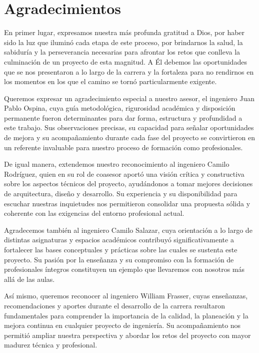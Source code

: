 
\section*{Agradecimientos}

En primer lugar, expresamos nuestra m\'as profunda gratitud a Dios, por haber sido la luz que ilumin\'o cada etapa de este proceso, por brindarnos la salud, la sabidur\'ia y la perseverancia necesarias para afrontar los retos que conlleva la culminaci\'on de un proyecto de esta magnitud. A \'El debemos las oportunidades que se nos presentaron a lo largo de la carrera y la fortaleza para no rendirnos en los momentos en los que el camino se torn\'o particularmente exigente.

Queremos expresar un agradecimiento especial a nuestro asesor, el ingeniero Juan Pablo Ospina, cuya gu\'ia metodol\'ogica, rigurosidad acad\'emica y disposici\'on permanente fueron determinantes para dar forma, estructura y profundidad a este trabajo. Sus observaciones precisas, su capacidad para se\~nalar oportunidades de mejora y su acompa\~namiento durante cada fase del proyecto se convirtieron en un referente invaluable para nuestro proceso de formaci\'on como profesionales.

De igual manera, extendemos nuestro reconocimiento al ingeniero Camilo Rodr\'iguez, quien en su rol de coasesor aport\'o una visi\'on cr\'itica y constructiva sobre los aspectos t\'ecnicos del proyecto, ayud\'andonos a tomar mejores decisiones de arquitectura, dise\~no y desarrollo. Su experiencia y su disponibilidad para escuchar nuestras inquietudes nos permitieron consolidar una propuesta s\'olida y coherente con las exigencias del entorno profesional actual.

Agradecemos tambi\'en al ingeniero Camilo Salazar, cuya orientaci\'on a lo largo de distintas asignaturas y espacios acad\'emicos contribuy\'o significativamente a fortalecer las bases conceptuales y pr\'acticas sobre las cuales se sustenta este proyecto. Su pasi\'on por la ense\~nanza y su compromiso con la formaci\'on de profesionales \'integros constituyen un ejemplo que llevaremos con nosotros m\'as all\'a de las aulas.

As\'i mismo, queremos reconocer al ingeniero William Frasser, cuyas ense\~nanzas, recomendaciones y aportes durante el desarrollo de la carrera resultaron fundamentales para comprender la importancia de la calidad, la planeaci\'on y la mejora continua en cualquier proyecto de ingenier\'ia. Su acompa\~namiento nos permiti\'o ampliar nuestra perspectiva y abordar los retos del proyecto con mayor madurez t\'ecnica y profesional.

